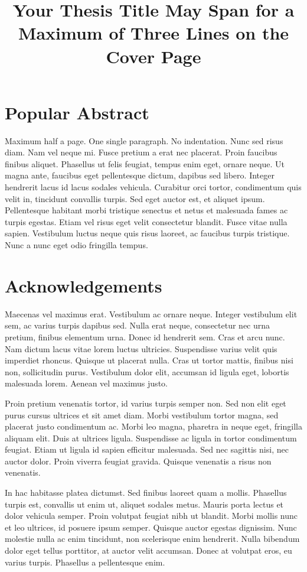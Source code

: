 \documentclass[
    colorlinks=true,        %
    linkcolor=black,          %
    anchorcolor=black,      %
    citecolor=black,         %
    urlcolor=black,          %
    bookmarks=true,         %
    bookmarksopen=false,    %
    bookmarksnumbered=true,  %
    dvipsnames
]{MAE}
\title{Your Thesis Title May Span for a Maximum of Three Lines on the Cover Page}
\begin{document}
\makeMAEtitle

\section*{Popular Abstract}

\noindent Maximum half a page. One single paragraph. No indentation. Nunc sed risus diam. Nam vel neque mi. Fusce pretium a erat nec placerat. Proin faucibus finibus aliquet. Phasellus ut felis feugiat, tempus enim eget, ornare neque. Ut magna ante, faucibus eget pellentesque dictum, dapibus sed libero. Integer hendrerit lacus id lacus sodales vehicula. Curabitur orci tortor, condimentum quis velit in, tincidunt convallis turpis. Sed eget auctor est, et aliquet ipsum. Pellentesque habitant morbi tristique senectus et netus et malesuada fames ac turpis egestas. Etiam vel risus eget velit consectetur blandit. Fusce vitae nulla sapien. Vestibulum luctus neque quis risus laoreet, ac faucibus turpis tristique. Nunc a nunc eget odio fringilla tempus.

\newpage

\section*{Acknowledgements}

Maecenas vel maximus erat. Vestibulum ac ornare neque. Integer vestibulum elit sem, ac varius turpis dapibus sed. Nulla erat neque, consectetur nec urna pretium, finibus elementum urna. Donec id hendrerit sem. Cras et arcu nunc. Nam dictum lacus vitae lorem luctus ultricies. Suspendisse varius velit quis imperdiet rhoncus. Quisque ut placerat nulla. Cras ut tortor mattis, finibus nisi non, sollicitudin purus. Vestibulum dolor elit, accumsan id ligula eget, lobortis malesuada lorem. Aenean vel maximus justo.

Proin pretium venenatis tortor, id varius turpis semper non. Sed non elit eget purus cursus ultrices et sit amet diam. Morbi vestibulum tortor magna, sed placerat justo condimentum ac. Morbi leo magna, pharetra in neque eget, fringilla aliquam elit. Duis at ultrices ligula. Suspendisse ac ligula in tortor condimentum feugiat. Etiam ut ligula id sapien efficitur malesuada. Sed nec sagittis nisi, nec auctor dolor. Proin viverra feugiat gravida. Quisque venenatis a risus non venenatis.

In hac habitasse platea dictumst. Sed finibus laoreet quam a mollis. Phasellus turpis est, convallis ut enim ut, aliquet sodales metus. Mauris porta lectus et dolor vehicula semper. Proin volutpat feugiat nibh ut blandit. Morbi mollis nunc et leo ultrices, id posuere ipsum semper. Quisque auctor egestas dignissim. Nunc molestie nulla ac enim tincidunt, non scelerisque enim hendrerit. Nulla bibendum dolor eget tellus porttitor, at auctor velit accumsan. Donec at volutpat eros, eu varius turpis. Phasellus a pellentesque enim.
\end{document}
